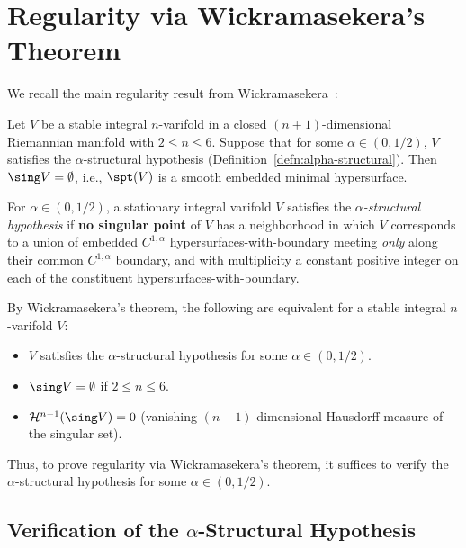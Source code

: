 \section{Regularity via Wickramasekera's Theorem}

We recall the main regularity result from Wickramasekera~\cite{Wic14}:

\begin{theorem}\label{thm:wickramasekera}
    Let $V$ be a stable integral $n$-varifold in a closed $(n+1)$-dimensional Riemannian manifold
    with $2\leq n\leq 6$. Suppose that for some $\alpha \in (0, 1/2)$, $V$ satisfies the $\alpha$-structural hypothesis (Definition~\ref{defn:alpha-structural}).
    Then $\sing V = \emptyset$, i.e., $\spt(V)$ is a smooth embedded minimal hypersurface.
\end{theorem}

\begin{definition}\label{defn:alpha-structural}
For $\alpha \in (0, 1/2)$, a stationary integral varifold $V$ satisfies the \emph{$\alpha$-structural hypothesis} if \textbf{no singular point}
of $V$ has a neighborhood in which $V$ corresponds to a union of embedded $C^{1,\alpha}$ hypersurfaces-with-boundary
meeting \emph{only} along their common $C^{1,\alpha}$ boundary, and with multiplicity a constant positive integer
on each of the constituent hypersurfaces-with-boundary.
\end{definition}

\begin{remark}
By Wickramasekera's theorem, the following are equivalent for a stable integral $n$-varifold $V$:
\begin{itemize}
    \item[(a)] $V$ satisfies the $\alpha$-structural hypothesis for some $\alpha \in (0, 1/2)$.
    \item[(b)] $\sing V = \emptyset$ if $2 \leq n \leq 6$.
    \item[(c)] $\mathcal{H}^{n-1}(\sing V) = 0$ (vanishing $(n-1)$-dimensional Hausdorff measure of the singular set).
\end{itemize}
Thus, to prove regularity via Wickramasekera's theorem, it suffices to verify the $\alpha$-structural hypothesis for some $\alpha \in (0, 1/2)$.
\end{remark}

\subsection{Verification of the $\alpha$-Structural Hypothesis}\label{sec:alpha-verification}


